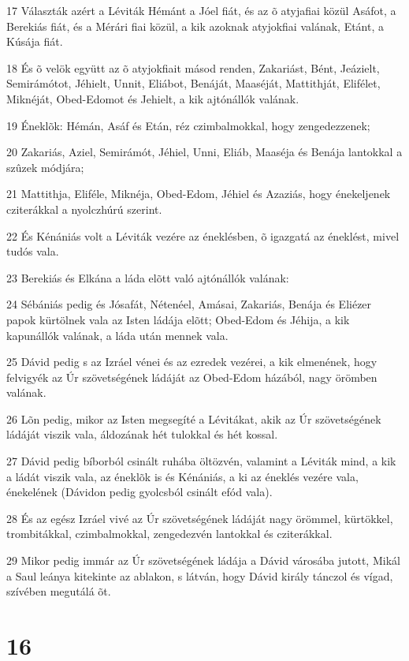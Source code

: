 \par 17 Választák azért a Léviták Hémánt a Jóel fiát, és az õ atyjafiai közül Asáfot, a Berekiás fiát, és a Mérári fiai közül, a kik azoknak atyjokfiai valának, Etánt, a Kúsája fiát.
\par 18 És õ velök együtt az õ atyjokfiait másod renden, Zakariást, Bént, Jeázielt, Semirámótot, Jéhielt, Unnit, Eliábot, Benáját, Maaséját, Mattithját, Elifélet, Miknéját, Obed-Edomot és Jehielt, a kik ajtónállók valának.
\par 19 Éneklõk: Hémán, Asáf  és Etán, réz czimbalmokkal, hogy zengedezzenek;
\par 20 Zakariás, Aziel, Semirámót, Jéhiel, Unni, Eliáb, Maaséja és Benája lantokkal a szûzek módjára;
\par 21 Mattithja, Eliféle, Miknéja, Obed-Edom, Jéhiel és Azaziás, hogy énekeljenek cziterákkal a nyolczhúrú szerint.
\par 22 És Kénániás volt a Léviták vezére az éneklésben, õ igazgatá az éneklést, mivel tudós vala.
\par 23 Berekiás és Elkána a láda elõtt való ajtónállók valának:
\par 24 Sébániás pedig és Jósafát, Nétenéel, Amásai, Zakariás, Benája és Eliézer papok kürtölnek vala az Isten ládája elõtt; Obed-Edom és Jéhija, a kik kapunállók valának, a láda után mennek vala.
\par 25 Dávid pedig s az Izráel vénei és az ezredek vezérei, a kik elmenének, hogy felvigyék az Úr szövetségének ládáját az Obed-Edom házából, nagy örömben valának.
\par 26 Lõn pedig, mikor az Isten megsegíté a Lévitákat, akik az Úr szövetségének ládáját viszik vala, áldozának hét tulokkal és hét kossal.
\par 27 Dávid pedig bíborból csinált ruhába öltözvén, valamint a Léviták mind, a kik a ládát viszik vala, az éneklõk is és Kénániás, a ki az éneklés vezére vala, énekelének (Dávidon pedig gyolcsból csinált efód vala).
\par 28 És az egész Izráel vivé az Úr szövetségének ládáját nagy örömmel, kürtökkel, trombitákkal, czimbalmokkal, zengedezvén lantokkal és cziterákkal.
\par 29 Mikor pedig immár az Úr szövetségének ládája a Dávid városába jutott, Mikál a Saul leánya kitekinte az ablakon, s látván, hogy Dávid király tánczol és vígad, szívében megutálá õt.

\chapter{16}

